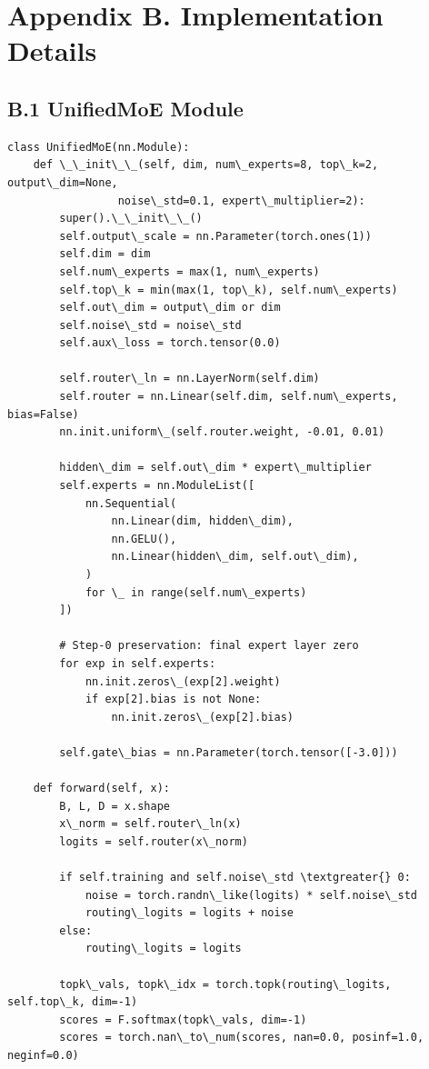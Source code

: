 \section{Appendix B. Implementation Details}

\subsection{B.1 UnifiedMoE Module}

\begin{lstlisting}
class UnifiedMoE(nn.Module):
    def \_\_init\_\_(self, dim, num\_experts=8, top\_k=2, output\_dim=None,
                 noise\_std=0.1, expert\_multiplier=2):
        super().\_\_init\_\_()
        self.output\_scale = nn.Parameter(torch.ones(1))
        self.dim = dim
        self.num\_experts = max(1, num\_experts)
        self.top\_k = min(max(1, top\_k), self.num\_experts)
        self.out\_dim = output\_dim or dim
        self.noise\_std = noise\_std
        self.aux\_loss = torch.tensor(0.0)
        
        self.router\_ln = nn.LayerNorm(self.dim)
        self.router = nn.Linear(self.dim, self.num\_experts, bias=False)
        nn.init.uniform\_(self.router.weight, -0.01, 0.01)
        
        hidden\_dim = self.out\_dim * expert\_multiplier
        self.experts = nn.ModuleList([
            nn.Sequential(
                nn.Linear(dim, hidden\_dim),
                nn.GELU(),
                nn.Linear(hidden\_dim, self.out\_dim),
            )
            for \_ in range(self.num\_experts)
        ])
        
        # Step-0 preservation: final expert layer zero
        for exp in self.experts:
            nn.init.zeros\_(exp[2].weight)
            if exp[2].bias is not None:
                nn.init.zeros\_(exp[2].bias)
        
        self.gate\_bias = nn.Parameter(torch.tensor([-3.0]))
    
    def forward(self, x):
        B, L, D = x.shape
        x\_norm = self.router\_ln(x)
        logits = self.router(x\_norm)
        
        if self.training and self.noise\_std \textgreater{} 0:
            noise = torch.randn\_like(logits) * self.noise\_std
            routing\_logits = logits + noise
        else:
            routing\_logits = logits
        
        topk\_vals, topk\_idx = torch.topk(routing\_logits, self.top\_k, dim=-1)
        scores = F.softmax(topk\_vals, dim=-1)
        scores = torch.nan\_to\_num(scores, nan=0.0, posinf=1.0, neginf=0.0)
        

\end{lstlisting}
